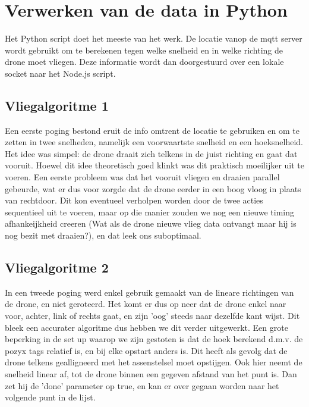 \section{Verwerken van de data in Python}


Het Python script doet het meeste van het werk. De locatie vanop de mqtt server wordt gebruikt om te berekenen tegen welke snelheid en in welke richting de drone moet vliegen. Deze informatie wordt dan doorgestuurd over een lokale socket naar het Node.js script.

\subsection{Vliegalgoritme 1}

Een eerste poging bestond eruit de info omtrent de locatie te gebruiken en om te zetten in twee snelheden, namelijk een voorwaartste snelheid en een hoeksnelheid. Het idee was simpel: de drone draait zich telkens in de juist richting en gaat dat vooruit. Hoewel dit idee theoretisch goed klinkt was dit praktisch moeilijker uit te voeren. Een eerste probleem was dat het vooruit vliegen en draaien parallel gebeurde, wat er dus voor zorgde dat de drone eerder in een boog vloog in plaats van rechtdoor. Dit kon eventueel verholpen worden door de twee acties sequentieel uit te voeren, maar op die manier zouden we nog een nieuwe timing afhankeijkheid creeren (Wat als de drone nieuwe vlieg data ontvangt maar hij is nog bezit met draaien?), en dat leek ons suboptimaal. 

\subsection{Vliegalgoritme 2}

In een tweede poging werd enkel gebruik gemaakt van de lineare richtingen van de drone, en niet geroteerd. Het komt er dus op neer dat de drone enkel naar voor, achter, link of rechts gaat, en zijn 'oog' steeds naar dezelfde kant wijst. Dit bleek een accurater algoritme dus hebben we dit verder uitgewerkt. Een grote beperking in de set up waarop we zijn gestoten is dat de hoek berekend d.m.v. de pozyx tags relatief is, en bij elke opstart anders is. Dit heeft als gevolg dat de drone telkens gealligneerd met het assenstelsel moet opstijgen. Ook hier neemt de snelheid linear af, tot de drone binnen een gegeven afstand van het punt is. Dan zet hij de 'done' parameter op true, en kan er over gegaan worden naar het volgende punt in de lijst.
